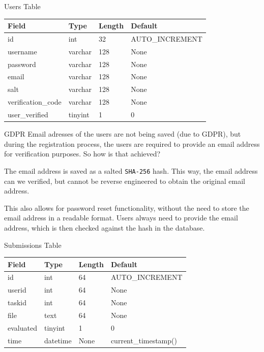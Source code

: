 \documentclass{beamer}
\begin{document}
	\begin{frame}{Users Table}
		\centering
		\begin{tabular}{|l|l|l|l|}
		\hline
		Field & Type & Length & Default \\
		\hline
		id & int & 32 & AUTO\_INCREMENT \\
		username & varchar & 128 & None \\
		password & varchar & 128 & None \\
		email & varchar & 128 & None \\
		salt & varchar & 128 & None \\
		verification\_code & varchar & 128 & None \\
		user\_verified & tinyint & 1 & 0 \\
		\hline
		\end{tabular}
	\end{frame}

	\begin{frame}{GDPR}
		Email adresses of the users are not being saved (due to GDPR), but during the registration process, the users are required to provide an email address for verification purposes. So how is that achieved?\par

		The email address is saved as a salted \texttt{SHA-256} hash. This way, the email address can we verified, but cannot be reverse engineered to obtain the original email address. \par

		This also allows for password reset functionality, without the need to store the email address in a readable format. Users always need to provide the email address, which is then checked against the hash in the database.
	\end{frame}

		\begin{frame}{Submissions Table}
			\centering
			\begin{tabular}{|l|l|l|l|}
			\hline
			Field & Type & Length & Default \\
			\hline
			id & int & 64 & AUTO\_INCREMENT \\
			userid & int & 64 & None \\
			taskid & int & 64 & None \\
			file & text & 64 & None \\
			evaluated & tinyint & 1 & 0 \\
			time & datetime & None & current\_timestamp() \\
			\hline
			\end{tabular}
		\end{frame}
\end{document}
